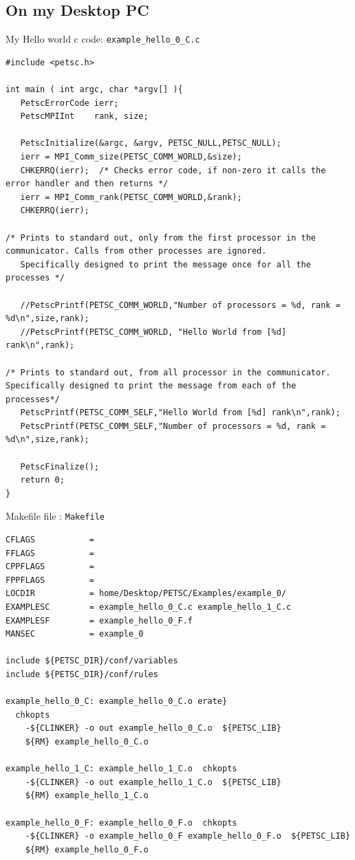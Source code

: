 \documentclass{article}
\begin{document}
\subsection{On my Desktop PC} 
My Hello world c code:  \verb+example_hello_0_C.c+ 
\scriptsize
\begin{verbatim}
#include <petsc.h>

int main ( int argc, char *argv[] ){
   PetscErrorCode ierr;
   PetscMPIInt    rank, size;
   
   PetscInitialize(&argc, &argv, PETSC_NULL,PETSC_NULL);
   ierr = MPI_Comm_size(PETSC_COMM_WORLD,&size);
   CHKERRQ(ierr);  /* Checks error code, if non-zero it calls the error handler and then returns */
   ierr = MPI_Comm_rank(PETSC_COMM_WORLD,&rank);
   CHKERRQ(ierr);

/* Prints to standard out, only from the first processor in the communicator. Calls from other processes are ignored.
   Specifically designed to print the message once for all the processes */
   
   //PetscPrintf(PETSC_COMM_WORLD,"Number of processors = %d, rank = %d\n",size,rank);
   //PetscPrintf(PETSC_COMM_WORLD, "Hello World from [%d] rank\n",rank); 

/* Prints to standard out, from all processor in the communicator. Specifically designed to print the message from each of the processes*/ 
   PetscPrintf(PETSC_COMM_SELF,"Hello World from [%d] rank\n",rank);  
   PetscPrintf(PETSC_COMM_SELF,"Number of processors = %d, rank = %d\n",size,rank);

   PetscFinalize();
   return 0;
}
\end{verbatim}
\normalsize
Makefile file : \verb+Makefile+
\scriptsize
\begin{verbatim}
CFLAGS	         = 
FFLAGS	         = 
CPPFLAGS         = 
FPPFLAGS         =
LOCDIR           = home/Desktop/PETSC/Examples/example_0/
EXAMPLESC        = example_hello_0_C.c example_hello_1_C.c 
EXAMPLESF        = example_hello_0_F.f 
MANSEC           = example_0

include ${PETSC_DIR}/conf/variables
include ${PETSC_DIR}/conf/rules

example_hello_0_C: example_hello_0_C.o erate}
  chkopts
	-${CLINKER} -o out example_hello_0_C.o  ${PETSC_LIB}
	${RM} example_hello_0_C.o

example_hello_1_C: example_hello_1_C.o  chkopts
	-${CLINKER} -o out example_hello_1_C.o  ${PETSC_LIB}
	${RM} example_hello_1_C.o

example_hello_0_F: example_hello_0_F.o  chkopts
	-${CLINKER} -o example_hello_0_F example_hello_0_F.o  ${PETSC_LIB}
	${RM} example_hello_0_F.o
\end{verbatim}
\end{document}
